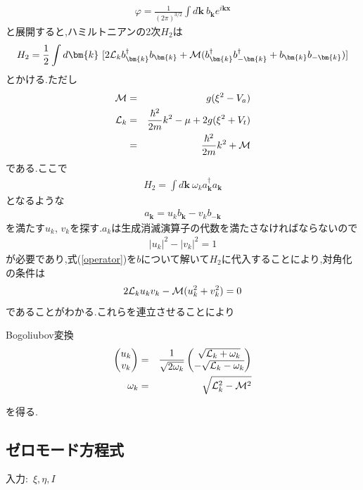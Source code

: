 \documentclass[10.5pt,a4paper]{jreport}
\begin{document}
\begin{eqnarray}
  \varphi = \frac{1}{(2\pi)^{3/2}}\int d\bm{k}\ b_{\bm{k}}e^{i\bm{k}\bm{x}}
\end{eqnarray}
と展開すると,ハミルトニアンの2次$H_2$は
\begin{eqnarray}
  H_2 = \frac{1}{2}\int d\bm{k}\ [2{\cal L}_kb^\dagger_{\bm{k}}b_{\bm{k}} + {\cal M}(b^\dagger_{\bm{k}}b^\dagger_{-\bm{k}} + b_{\bm{k}}b_{-\bm{k}})]
\end{eqnarray}
とかける.ただし
\begin{eqnarray}
  {\cal M} &=& g(\xi^2 - V_a)\\
  \nonumber  {\cal L}_k &=& \frac{\hbar^2}{2m}k^2 - \mu + 2g(\xi^2 + V_t)\\
  &=& \frac{\hbar^2}{2m}k^2 + {\cal M}
\end{eqnarray}
である.ここで
\begin{eqnarray}
  H_2 = \int d\bm{k}\ \omega_ka^\dagger_{\bm k}a_{\bm k}
\end{eqnarray}
となるような
\begin{eqnarray}
  a_{\bm k} = u_kb_{\bm k} - v_kb_{-\bm{k}}\label{operator}
\end{eqnarray}
を満たす$u_k$, $v_k$を探す.$a_k$は生成消滅演算子の代数を満たさなければならないので
\begin{eqnarray}
  |u_k|^2-|v_k|^2=1
\end{eqnarray}
が必要であり,式(\ref{operator})を$b$について解いて$H_2$に代入することにより,対角化の条件は
\begin{eqnarray}
  2{\cal L}_ku_kv_k -{\cal M}(u^2_k + v^2_k) = 0
\end{eqnarray}
であることがわかる.これらを連立させることにより
\begin{itembox}[c]{Bogoliubov変換}
  \begin{eqnarray}
    \begin{pmatrix}
      u_k\\
      v_k
    \end{pmatrix}
    &=& \frac{1}{\sqrt{2\omega_k}}
    \begin{pmatrix}
      \sqrt{{\cal L}_k + \omega_k}\\
      -\sqrt{{\cal L}_k - \omega_k}
    \end{pmatrix}\\
    \omega_k &=& \sqrt{{\cal L}^2_k - {\cal M}^2}
  \end{eqnarray}
\end{itembox}
を得る.
\subsection{ゼロモード方程式}
入力:\ $\xi, \eta, I$
\end{document}
